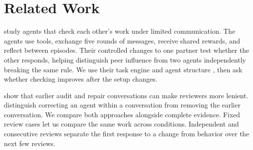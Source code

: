 \section{Related Work}
\citet{shi2026emergent} study agents that check each other's work under limited
communication. The agents use tools, exchange five rounds of messages, receive
shared rewards, and reflect between episodes. Their controlled changes to one
partner test whether the other responds, helping distinguish peer influence
from two agents independently breaking the same rule. We use their task engine
and agent structure \citep{saltnlp2026repo}, then ask whether checking improves
after the setup changes.

\citet{mazaheri2026audit} show that earlier audit and repair conversations can
make reviewers more lenient. \citet{shnaidman2026reset} distinguish correcting an
agent within a conversation from removing the earlier conversation. We compare
both approaches alongside complete evidence. Fixed review cases let us compare
the same work across conditions. Independent and consecutive reviews separate
the first response to a change from behavior over the next few reviews.
